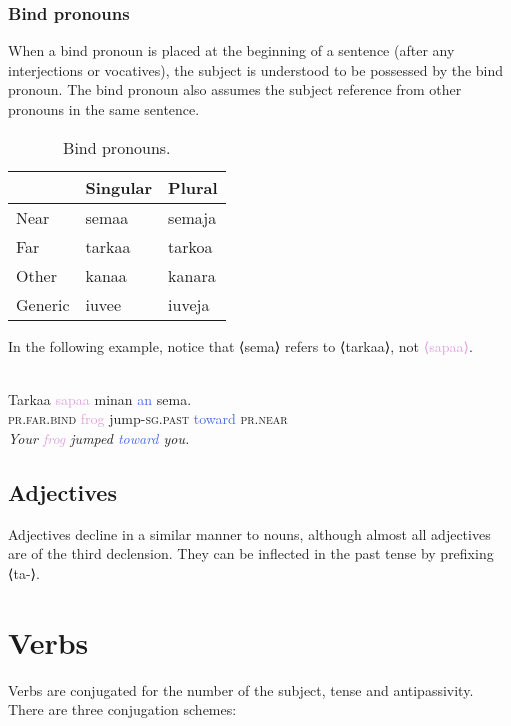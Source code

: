 \documentclass{book}
\newcommand{\ortho}[1]{⟨#1⟩}
\newcommand{\tsc}{\textsc}
\newcommand{\hli}[1]{\textcolor{Plum}{#1}}
\newcommand{\hlii}[1]{\textcolor{UruwiGreen}{#1}}
\newcommand{\hliii}[1]{\textcolor{RoyalBlue}{#1}}
\newcommand{\hliv}[1]{\textcolor{RubineRed}{#1}}
\newcommand{\hlv}[1]{\textcolor{Bittersweet}{#1}}
\begin{document}
\subsection{Bind pronouns}

When a bind pronoun is placed at the beginning of a sentence (after any interjections or vocatives), the subject is understood to be possessed by the bind pronoun. The bind pronoun also assumes the subject reference from other pronouns in the same sentence.

\begin{table}[h]
    \caption{Bind pronouns.}
    \centering
    \begin{tabular}{|l|l|l|}
        \hline
        & Singular & Plural \\
        \hline
        Near & semaa & semaja \\
        Far & tarkaa & tarkoa \\
        Other & kanaa & kanara \\
        Generic & iuvee & iuveja \\
        \hline
    \end{tabular}
\end{table}

In the following example, notice that \hlv{\ortho{sema}} refers to \hliv{\ortho{tarkaa}}, not \hli{\ortho{sapaa}}.

~ \\
\hliv{Tarkaa} \hli{sapaa} \hlii{minan} \hliii{an} \hlv{sema.} \\
\hliv{\tsc{pr}.\tsc{far}.\tsc{bind}} \hli{frog} \hlii{jump-\tsc{sg}.\tsc{past}} \hliii{toward} \hlv{\tsc{pr}.\tsc{near}} \\
\emph{\hliv{Your} \hli{frog} \hlii{jumped} \hliii{toward} \hlv{you.}}

\section{Adjectives}

Adjectives decline in a similar manner to nouns, although almost all adjectives are of the third declension. They can be inflected in the past tense by prefixing \ortho{ta-}.

\chapter{Verbs}

Verbs are conjugated for the number of the subject, tense and antipassivity. There are three conjugation schemes:
\end{document}
